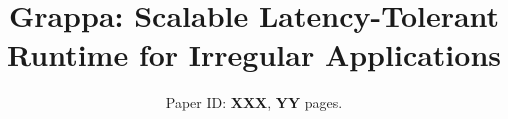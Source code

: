 
\usepackage{microtype}




\title{\Large Grappa: Scalable Latency-Tolerant Runtime for Irregular Applications}


\author{Paper ID: {\bf XXX}, {\bf YY} pages.}
\date{}


\maketitle
\begin{abstract}

\end{abstract}



















%






